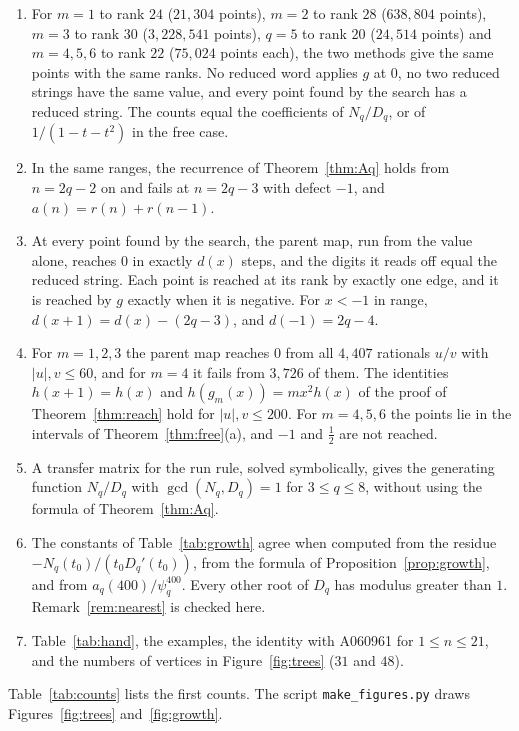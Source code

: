 \begin{enumerate}[itemsep=1pt,topsep=3pt]
\item For $m=1$ to rank $24$ ($21{,}304$ points), $m=2$ to rank $28$ ($638{,}804$ points), $m=3$ to
rank $30$ ($3{,}228{,}541$ points), $q=5$ to rank $20$ ($24{,}514$ points) and $m=4,5,6$ to rank $22$
($75{,}024$ points each), the two methods give the same points with the same ranks. No reduced word
applies $g$ at $0$, no two reduced strings have the same value, and every point found by the search
has a reduced string. The counts equal the coefficients of $N_q/D_q$, or of $1/(1-t-t^2)$ in the free
case.
\item In the same ranges, the recurrence of Theorem~\ref{thm:Aq} holds from $n=2q-2$ on and fails at
$n=2q-3$ with defect $-1$, and $a(n)=r(n)+r(n-1)$.
\item At every point found by the search, the parent map, run from the value alone, reaches $0$ in
exactly $d(x)$ steps, and the digits it reads off equal the reduced string. Each point is reached at
its rank by exactly one edge, and it is reached by $g$ exactly when it is negative. For $x<-1$ in range,
$d(x+1)=d(x)-(2q-3)$, and $d(-1)=2q-4$.
\item For $m=1,2,3$ the parent map reaches $0$ from all $4{,}407$ rationals $u/v$ with $|u|,v\le60$, and
for $m=4$ it fails from $3{,}726$ of them. The identities $h(x+1)=h(x)$ and $h(g_m(x))=mx^2h(x)$ of the
proof of Theorem~\ref{thm:reach} hold for $|u|,v\le200$. For $m=4,5,6$ the points lie in the intervals of
Theorem~\ref{thm:free}(a), and $-1$ and $\tfrac12$ are not reached.
\item A transfer matrix for the run rule, solved symbolically, gives the generating function $N_q/D_q$
with $\gcd(N_q,D_q)=1$ for $3\le q\le8$, without using the formula of Theorem~\ref{thm:Aq}.
\item The constants of Table~\ref{tab:growth} agree when computed from the residue
$-N_q(t_0)/(t_0D_q'(t_0))$, from the formula of Proposition~\ref{prop:growth}, and from
$a_q(400)/\psi_q^{400}$. Every other root of $D_q$ has modulus greater than $1$. Remark~\ref{rem:nearest}
is checked here.
\item Table~\ref{tab:hand}, the examples, the identity with A060961 for $1\le n\le21$, and the
numbers of vertices in Figure~\ref{fig:trees} ($31$ and $48$).
\end{enumerate}

Table~\ref{tab:counts} lists the first counts. The script \texttt{make\_figures.py} draws
Figures~\ref{fig:trees} and~\ref{fig:growth}.

